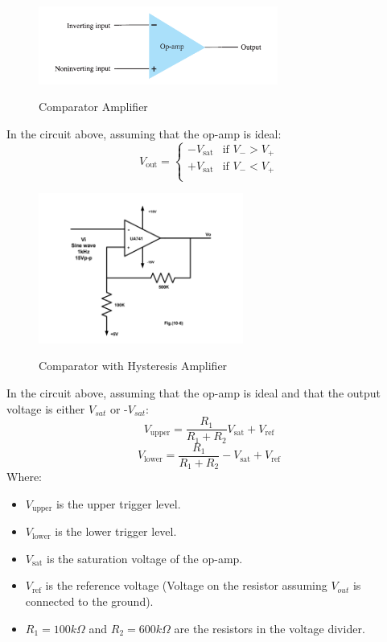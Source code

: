 \documentclass[12pt]{article}
\begin{document}
\begin{figure}[H]
    \centering
    \includegraphics[width=0.7\textwidth]{assets//main/main/2023-08-27-22-55-04.png.png}
    \caption{Comparator Amplifier}
    \cite{my_book}
\end{figure}
In the circuit above, assuming that the op-amp is ideal:
\begin{equation}
    V_{\text{out}} = \begin{cases} 
        -V_{\text{sat}} & \text{if } V_{-} > V_{+} \\
        +V_{\text{sat}} & \text{if } V_{-} < V_{+} \\
    \end{cases}
\end{equation}

\begin{figure}[H]
    \centering
    \includegraphics[width=0.6\textwidth]{assets/main/2023-08-27-19-57-16.png}
    \caption{Comparator with Hysteresis Amplifier}
    \cite{manual}
\end{figure}
In the circuit above, assuming that the op-amp is ideal and that the output voltage is either $V_{sat}$ or -$V_{sat}$:
\begin{equation}
    V_{\text{upper}} = \frac{R_1}{R_1 + R_2}V_{\text{sat}} + V_{\text{ref}}
\end{equation}
\begin{equation}
    V_{\text{lower}} = \frac{R_1}{R_1 + R_2}-V_{\text{sat}} + V_{\text{ref}}
\end{equation}
Where:
\begin{itemize}
    \item $V_{\text{upper}}$ is the upper trigger level.
    \item $V_{\text{lower}}$ is the lower trigger level.
    \item $V_{\text{sat}}$ is the saturation voltage of the op-amp.
    \item $V_{\text{ref}}$ is the reference voltage (Voltage on the resistor assuming $V_{out}$ is connected to the ground).
    \item $R_1 = 100k\Omega$ and $R_2 = 600k\Omega$ are the resistors in the voltage divider.
\end{itemize}
\end{document}
